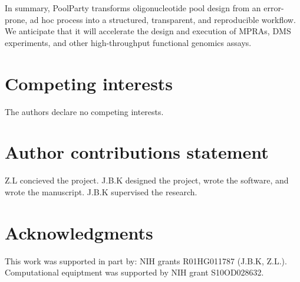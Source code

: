 \documentclass[unnumsec,webpdf,modern,large]{mam-authoring-template}%
\theoremstyle{thmstyleone}%
\theoremstyle{thmstyletwo}%
\theoremstyle{thmstylethree}%
\begin{document}
In summary, PoolParty transforms oligonucleotide pool design from an error-prone, ad hoc process into a structured, transparent, and reproducible workflow. We anticipate that it will accelerate the design and execution of MPRAs, DMS experiments, and other high-throughput functional genomics assays.

\section{Competing interests}
The authors declare no competing interests.

\section{Author contributions statement}
Z.L concieved the project. J.B.K designed the project, wrote the software, and wrote the manuscript. J.B.K supervised the research.

\section{Acknowledgments}
This work was supported in part by: NIH grants R01HG011787 (J.B.K, Z.L.). Computational equiptment was supported by NIH grant S10OD028632.


\end{document}
